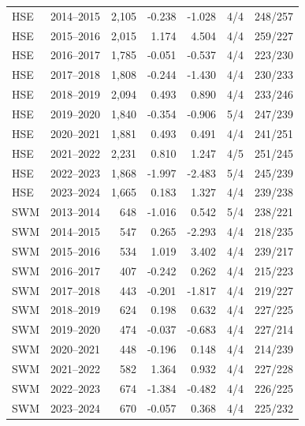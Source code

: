 \begin{longtable}{@{}llrrrrr@{}}
HSE & 2014--2015 & 2,105 & -0.238 & -1.028 & 4/4 & 248/257 \\
HSE & 2015--2016 & 2,015 & 1.174 & 4.504 & 4/4 & 259/227 \\
HSE & 2016--2017 & 1,785 & -0.051 & -0.537 & 4/4 & 223/230 \\
HSE & 2017--2018 & 1,808 & -0.244 & -1.430 & 4/4 & 230/233 \\
HSE & 2018--2019 & 2,094 & 0.493 & 0.890 & 4/4 & 233/246 \\
HSE & 2019--2020 & 1,840 & -0.354 & -0.906 & 5/4 & 247/239 \\
HSE & 2020--2021 & 1,881 & 0.493 & 0.491 & 4/4 & 241/251 \\
HSE & 2021--2022 & 2,231 & 0.810 & 1.247 & 4/5 & 251/245 \\
HSE & 2022--2023 & 1,868 & -1.997 & -2.483 & 5/4 & 245/239 \\
HSE & 2023--2024 & 1,665 & 0.183 & 1.327 & 4/4 & 239/238 \\
SWM & 2013--2014 & 648 & -1.016 & 0.542 & 5/4 & 238/221 \\
SWM & 2014--2015 & 547 & 0.265 & -2.293 & 4/4 & 218/235 \\
SWM & 2015--2016 & 534 & 1.019 & 3.402 & 4/4 & 239/217 \\
SWM & 2016--2017 & 407 & -0.242 & 0.262 & 4/4 & 215/223 \\
SWM & 2017--2018 & 443 & -0.201 & -1.817 & 4/4 & 219/227 \\
SWM & 2018--2019 & 624 & 0.198 & 0.632 & 4/4 & 227/225 \\
SWM & 2019--2020 & 474 & -0.037 & -0.683 & 4/4 & 227/214 \\
SWM & 2020--2021 & 448 & -0.196 & 0.148 & 4/4 & 214/239 \\
SWM & 2021--2022 & 582 & 1.364 & 0.932 & 4/4 & 227/228 \\
SWM & 2022--2023 & 674 & -1.384 & -0.482 & 4/4 & 226/225 \\
SWM & 2023--2024 & 670 & -0.057 & 0.368 & 4/4 & 225/232 \\
\end{longtable}

\endgroup
